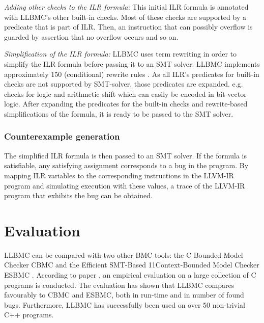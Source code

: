\documentclass[14pt]{article}
\begin{document}
{ \par \textit{Adding other checks to the ILR formula:} This initial ILR formula is annotated with LLBMC's other built-in checks. Most of these checks are supported by a predicate that is part of ILR. Then, an instruction that can possibly overflow is guarded by assertion that no overflow occurs and so on. 
 
 \par \textit{Simplification of the ILR formula:} LLBMC uses term rewriting in order to simplify the ILR formula before passing it to an SMT solver. LLBMC implements  approximately 150 (conditional) rewrite rules \cite{llbmc0}. As all ILR's predicates for built-in checks are not supported by SMT-solver, those predicates are expanded. e.g. checks for logic and arithmetic shift which can easily be encoded in bit-vector logic. After expanding the predicates for the built-in checks and rewrite-based simplifications of the formula, it is ready to be passed to the SMT solver.
  
  
  \subsubsection*{Counterexample generation}\label{Counterexample generation} The simplified ILR formula is then passed to an SMT solver. If the formula is satisfiable, any satisfying assignment corresponds to a bug in the program. By mapping ILR variables to the corresponding instructions in the LLVM-IR program and simulating execution with these values, a trace of the LLVM-IR program that exhibits the bug can be obtained. 
  
  
\section{Evaluation}\label{Evaluation}
LLBMC can be compared with two other BMC tools: the C Bounded Model Checker CBMC  \cite{CBMC} and the Efficient SMT-Based
11Context-Bounded Model Checker ESBMC  \cite{ESBMC}. According to paper \cite{llbmc0},  an empirical evaluation on a large collection of C programs is conducted. The evaluation has shown that LLBMC compares favourably to CBMC and ESBMC, both in run-time and in number of found bugs. Furthermore, LLBMC has successfully been used on over 50 non-trivial C++ programs. 


}
\end{document}
